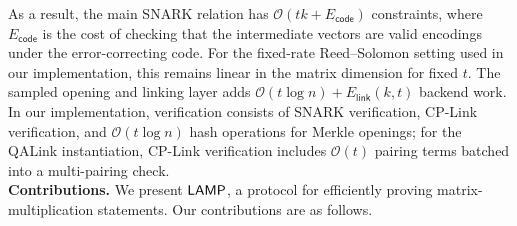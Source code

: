 As a result, the main SNARK relation has
\(\mathcal{O}(tk+E_{\mathsf{code}})\) constraints, where
\(E_{\mathsf{code}}\) is the cost of checking that the
intermediate vectors are valid encodings under the error-correcting code. For the fixed-rate Reed--Solomon setting used in our implementation,
this remains linear in the matrix dimension for fixed \(t\).  The sampled
opening and linking layer adds
\(\mathcal{O}(t\log n)+E_{\mathsf{link}}(k,t)\) backend work.  In our
implementation, verification consists of SNARK verification, CP-Link
verification, and \(\mathcal{O}(t\log n)\) hash operations for Merkle openings;
for the QALink instantiation, CP-Link verification includes
\(\mathcal{O}(t)\) pairing terms batched into a multi-pairing check.\\


\noindent\textbf{Contributions.}
We present \(\textsf{LAMP}\), a protocol for efficiently proving
matrix-multiplication statements.  Our contributions are as follows.

